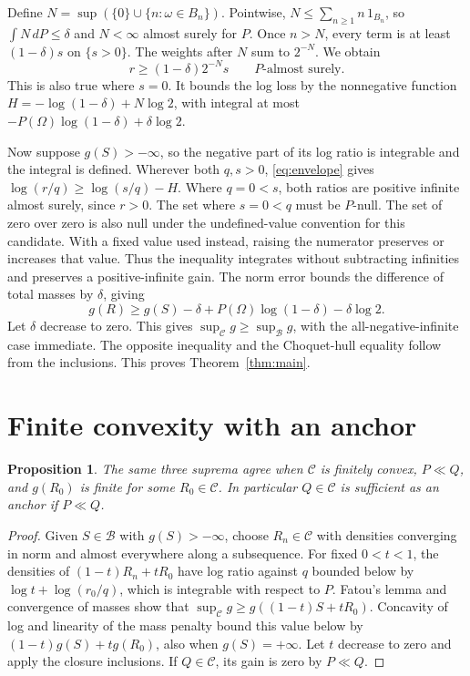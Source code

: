 \documentclass[11pt,a4paper]{amsart}
\newtheorem{proposition}[theorem]{Proposition}
\begin{document}
Define \(N=\sup(\{0\}\cup\{n:\omega\in B_n\})\). Pointwise, \(N\le\sum_{n\ge1}n\,1_{B_n}\), so \(\int N\,dP\le\delta\) and \(N<\infty\) almost surely for \(P\). Once \(n>N\), every term is at least \((1-\delta)s\) on \(\{s>0\}\). The weights after \(N\) sum to \(2^{-N}\). We obtain
\begin{equation}\label{eq:envelope}
 r\ge (1-\delta)2^{-N}s\qquad P\text{-almost surely}.
\end{equation}
This is also true where \(s=0\). It bounds the log loss by the nonnegative function \(H=-\log(1-\delta)+N\log2\), with integral at most \(-P(\Omega)\log(1-\delta)+\delta\log 2\).

Now suppose \(g(S)>-\infty\), so the negative part of its log ratio is integrable and the integral is defined. Wherever both \(q,s>0\), \eqref{eq:envelope} gives \(\log(r/q)\ge\log(s/q)-H\). Where \(q=0<s\), both ratios are positive infinite almost surely, since \(r>0\). The set where \(s=0<q\) must be \(P\)-null. The set of zero over zero is also null under the undefined-value convention for this candidate. With a fixed value used instead, raising the numerator preserves or increases that value. Thus the inequality integrates without subtracting infinities and preserves a positive-infinite gain. The norm error bounds the difference of total masses by \(\delta\), giving
\begin{equation}\label{eq:approx}
 g(R)\ge g(S)-\delta+P(\Omega)\log(1-\delta)-\delta\log2 .
\end{equation}
Let \(\delta\) decrease to zero. This gives \(\sup_{\mathcal C}g\ge\sup_{\mathcal B}g\), with the all-negative-infinite case immediate. The opposite inequality and the Choquet-hull equality follow from the inclusions. This proves Theorem~\ref{thm:main}.

\section{Finite convexity with an anchor}

\begin{proposition}\label{prop:anchor}
The same three suprema agree when \(\mathcal C\) is finitely convex, \(P\ll Q\), and \(g(R_0)\) is finite for some \(R_0\in\mathcal C\). In particular \(Q\in\mathcal C\) is sufficient as an anchor if \(P\ll Q\).
\end{proposition}

\begin{proof}
Given \(S\in\mathcal B\) with \(g(S)>-\infty\), choose \(R_n\in\mathcal C\) with densities converging in norm and almost everywhere along a subsequence. For fixed \(0<t<1\), the densities of \((1-t)R_n+tR_0\) have log ratio against \(q\) bounded below by \(\log t+\log(r_0/q)\), which is integrable with respect to \(P\). Fatou's lemma and convergence of masses show that \(\sup_{\mathcal C}g\ge g((1-t)S+tR_0)\). Concavity of log and linearity of the mass penalty bound this value below by \((1-t)g(S)+tg(R_0)\), also when \(g(S)=+\infty\). Let \(t\) decrease to zero and apply the closure inclusions. If \(Q\in\mathcal C\), its gain is zero by \(P\ll Q\).
\end{proof}
\end{document}
